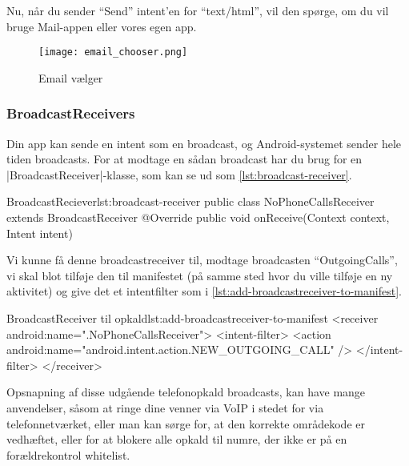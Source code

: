 Nu, når du sender ``Send'' intent'en for ``text/html'', vil den spørge, om du vil bruge Mail-appen eller vores egen app.

\begin{figure}[h]
	\begin{center}
		\texttt{[image: email\_chooser.png]}
		\caption{Email vælger}
		\label{fig:android:activities:email_chooser}
	\end{center}
\end{figure}

\subsubsection{BroadcastReceivers}

Din app kan sende en intent som en broadcast, og Android-systemet sender hele tiden broadcasts. For at modtage en sådan broadcast har du brug for en \JavaInline|BroadcastReceiver|-klasse, som kan se ud som \autoref{lst:broadcast-receiver}.

\begin{example}\noindent
	\begin{JavaCode}{BroadcastReciever}{lst:broadcast-receiver}
		public class NoPhoneCallsReceiver extends BroadcastReceiver {
			@Override
			public void onReceive(Context context, Intent intent) {
			}
		}
	\end{JavaCode}
\end{example}

Vi kunne få denne broadcastreceiver til, modtage broadcasten ``OutgoingCalls'', vi skal blot tilføje den til manifestet (på samme sted hvor du ville tilføje en ny aktivitet) og give det et intentfilter som i \autoref{lst:add-broadcastreceiver-to-manifest}.

\begin{example}\noindent
	\begin{XmlCode}{BroadcastReceiver til opkald}{lst:add-broadcastreceiver-to-manifest}
		<receiver android:name=".NoPhoneCallsReceiver">
			<intent-filter>
				<action android:name="android.intent.action.NEW_OUTGOING_CALL" />
			</intent-filter>
		</receiver>
	\end{XmlCode}
\end{example}

Opsnapning af disse udgående telefonopkald broadcasts, kan have mange anvendelser, såsom at ringe dine venner via VoIP i stedet for via telefonnetværket, eller man kan sørge for, at den korrekte områdekode er vedhæftet, eller for at blokere alle opkald til numre, der ikke er på en forældrekontrol whitelist.

